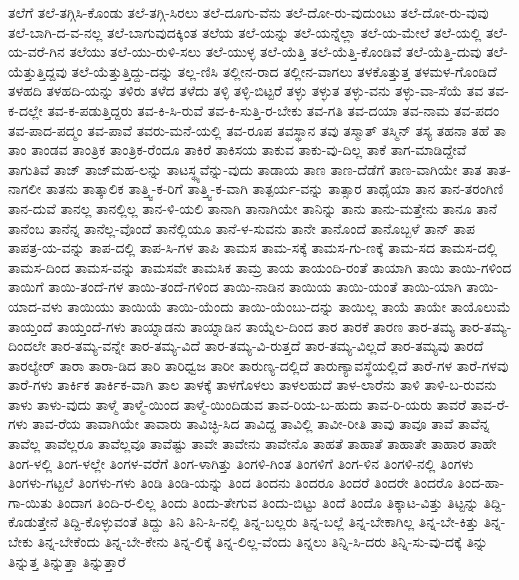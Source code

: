 ತಲೆಗೆ
ತಲೆ-ತಗ್ಗಿಸಿ-ಕೊಂಡು
ತಲೆ-ತಗ್ಗಿ-ಸಿರಲು
ತಲೆ-ದೂಗು-ವೆನು
ತಲೆ-ದೋ-ರು-ವುದುಂಟು
ತಲೆ-ದೋ-ರು-ವುವು
ತಲೆ-ಬಾಗಿ-ದ-ವ-ನಲ್ಲ
ತಲೆ-ಬಾಗುವುದಕ್ಕಿಂತ
ತಲೆಯ
ತಲೆ-ಯನ್ನು
ತಲೆ-ಯನ್ನೆಲ್ಲಾ
ತಲೆ-ಯ-ಮೇಲೆ
ತಲೆ-ಯಲ್ಲಿ
ತಲೆ-ಯ-ವರೆ-ಗಿನ
ತಲೆಯು
ತಲೆ-ಯು-ರುಳಿ-ಸಲು
ತಲೆ-ಯುಳ್ಳ
ತಲೆ-ಯೆತ್ತಿ
ತಲೆ-ಯೆತ್ತಿ-ಕೊಂಡಿವೆ
ತಲೆ-ಯೆತ್ತಿ-ದುವು
ತಲೆ-ಯೆತ್ತುತ್ತಿದ್ದವು
ತಲೆ-ಯೆತ್ತುತ್ತಿದ್ದು-ದನ್ನು
ತಲ್ಲ-ಣಿಸಿ
ತಲ್ಲೀನ-ರಾದ
ತಲ್ಲೀನ-ವಾಗಲು
ತಳಕೊತ್ತುತ್ತ
ತಳಮಳ-ಗೊಂಡಿದೆ
ತಳಹದಿ
ತಳಹದಿ-ಯನ್ನು
ತಳಿರು
ತಳೆದ
ತಳೆದು
ತಳ್ಳಿ
ತಳ್ಳಿ-ಬಿಟ್ಟರೆ
ತಳ್ಳು
ತಳ್ಳುತ
ತಳ್ಳು-ವನು
ತಳ್ಳು-ವಾ-ಸೆಯೆ
ತವ
ತವ-ಕ-ದಲ್ಲೇ
ತವ-ಕ-ಪಡುತ್ತಿದ್ದರು
ತವ-ಕಿ-ಸಿ-ರುವೆ
ತವ-ಕಿ-ಸುತ್ತಿ-ರ-ಬೇಕು
ತವ-ಗತಿ
ತವ-ದಯಾ
ತವ-ನಾಮ
ತವ-ಪದಂ
ತವ-ಪಾದ-ಪದ್ಮಂ
ತವ-ಪಾವೆ
ತವರು-ಮನೆ-ಯಲ್ಲಿ
ತವ-ರೂಪ
ತವಸ್ಥಾನ
ತವು
ತಸ್ಮಾತ್
ತಸ್ಮಿನ್
ತಸ್ಯ
ತಹನಾ
ತಹೆ
ತಾ
ತಾಂ
ತಾಂಡವ
ತಾಂತ್ರಿಕ
ತಾಂತ್ರಿಕ-ರೆಂದೂ
ತಾಕಿರೆ
ತಾಕಿಸಯ
ತಾಕುವ
ತಾಕು-ವು-ದಿಲ್ಲ
ತಾಕೆ
ತಾಗ-ಮಾಡಿದ್ದೇವೆ
ತಾಗುತಿವೆ
ತಾಜ್
ತಾಜ್‌ಮಹ-ಲನ್ನು
ತಾಟಸ್ಥ್ಯವೆನ್ನು-ವುದು
ತಾಡಾಯ
ತಾಣ
ತಾಣ-ದೆಡೆಗೆ
ತಾಣ-ವಾಗಿಯೇ
ತಾತ
ತಾತ-ನಾಗಲೀ
ತಾತನು
ತಾತ್ಕಾಲಿಕ
ತಾತ್ತ್ವಿ-ಕ-ರಿಗೆ
ತಾತ್ತ್ವಿ-ಕ-ವಾಗಿ
ತಾತ್ಪರ್ಯ-ವನ್ನು
ತಾತ್ಸಾರ
ತಾಥೈಯಾ
ತಾನ
ತಾನ-ತರಂಗಿಣಿ
ತಾನ-ದುವೆ
ತಾನಲ್ಲ
ತಾನಲ್ಲಿಲ್ಲ
ತಾನ-ಳಿ-ಯಲಿ
ತಾನಾಗಿ
ತಾನಾಗಿಯೇ
ತಾನಿನ್ನು
ತಾನು
ತಾನು-ಮತ್ತೇನು
ತಾನೂ
ತಾನೆ
ತಾನೆಂಬ
ತಾನೆನ್ನ
ತಾನೆಲ್ಲ-ವೊಂದೆ
ತಾನೆಲ್ಲಿಯೂ
ತಾನೆ-ಳ-ಸುವನು
ತಾನೇ
ತಾನೊಂದೆ
ತಾನೊಬ್ಬಳೆ
ತಾನ್
ತಾಪ
ತಾಪತ್ರ-ಯ-ವನ್ನು
ತಾಪ-ದಲ್ಲಿ
ತಾಪ-ಸಿ-ಗಳ
ತಾಪಿ
ತಾಮಸ
ತಾಮ-ಸಕ್ಕೆ
ತಾಮಸ-ಗು-ಣಕ್ಕೆ
ತಾಮ-ಸದ
ತಾಮಸ-ದಲ್ಲಿ
ತಾಮಸ-ದಿಂದ
ತಾಮಸ-ವನ್ನು
ತಾಮಸವೇ
ತಾಮಸಿಕ
ತಾಮ್ರ
ತಾಯ
ತಾಯಂದಿ-ರಂತೆ
ತಾಯಾಗಿ
ತಾಯಿ
ತಾಯಿ-ಗಳಿಂದ
ತಾಯಿಗೆ
ತಾಯಿ-ತಂದೆ-ಗಳ
ತಾಯಿ-ತಂದೆ-ಗಳಿಂದ
ತಾಯಿ-ನಾಡಿನ
ತಾಯಿಯ
ತಾಯಿ-ಯಂತೆ
ತಾಯಿ-ಯಾಗಿ
ತಾಯಿ-ಯಾದ-ವಳು
ತಾಯಿಯು
ತಾಯಿಯೆ
ತಾಯಿ-ಯೆಂದು
ತಾಯಿ-ಯೆಂಬು-ದನ್ನು
ತಾಯಿಲ್ಲ
ತಾಯೆ
ತಾಯೇ
ತಾಯೊಲುಮೆ
ತಾಯ್ತಂದೆ
ತಾಯ್ತಂದೆ-ಗಳು
ತಾಯ್ನಾಡನು
ತಾಯ್ನಾಡಿನ
ತಾಯ್ನೆಲ-ದಿಂದ
ತಾರ
ತಾರಕೆ
ತಾರಣ
ತಾರ-ತಮ್ಯ
ತಾರ-ತಮ್ಯ-ದಿಂದಲೇ
ತಾರ-ತಮ್ಯ-ವನ್ನೇ
ತಾರ-ತಮ್ಯ-ವಿದೆ
ತಾರ-ತಮ್ಯ-ವಿ-ರುತ್ತದೆ
ತಾರ-ತಮ್ಯ-ವಿಲ್ಲದೆ
ತಾರ-ತಮ್ಯವು
ತಾರದೆ
ತಾರಲ್ಯೇರ್
ತಾರಾ
ತಾರಾ-ಡಿದ
ತಾರಿ
ತಾರಿಧ್ವಜ
ತಾರೀ
ತಾರುಣ್ಯ-ದಲ್ಲಿದೆ
ತಾರುಣ್ಯಾವಸ್ಥೆಯಲ್ಲಿದೆ
ತಾರೆ-ಗಳ
ತಾರೆ-ಗಳವು
ತಾರೆ-ಗಳು
ತಾರ್ಕಿಕ
ತಾರ್ಕಿಕ-ವಾಗಿ
ತಾಲ
ತಾಳಕ್ಕೆ
ತಾಳಗೊಳಲು
ತಾಳಲಹುದೆ
ತಾಳ-ಲಾರೆನು
ತಾಳಿ
ತಾಳಿ-ಬ-ರುವನು
ತಾಳು
ತಾಳು-ವುದು
ತಾಳ್ಮೆ
ತಾಳ್ಮೆ-ಯಿಂದ
ತಾಳ್ಮೆ-ಯಿಂದಿಡುವ
ತಾವ-ರಿಯ-ಬ-ಹುದು
ತಾವ-ರಿ-ಯರು
ತಾವರೆ
ತಾವ-ರೆ-ಗಳು
ತಾವ-ರೆಯ
ತಾವಾಗಿಯೇ
ತಾವಾರು
ತಾವಿಚ್ಛಿ-ಸಿದ
ತಾವಿದ್ದ
ತಾವಿಲ್ಲಿ
ತಾವೀ-ರೀತಿ
ತಾವು
ತಾವೂ
ತಾವೆ
ತಾವೆನ್ನ
ತಾವೆಲ್ಲ
ತಾವೆಲ್ಲರೂ
ತಾವೆಲ್ಲವೂ
ತಾವೆಷ್ಟು
ತಾವೇ
ತಾವೇನು
ತಾವೇನೊ
ತಾಹತೆ
ತಾಹಾತೆ
ತಾಹಾತೇ
ತಾಹಾರ
ತಾಹೇ
ತಿಂಗ-ಳಲ್ಲಿ
ತಿಂಗ-ಳಲ್ಲೇ
ತಿಂಗಳ-ವರೆಗೆ
ತಿಂಗ-ಳಾಗಿತ್ತು
ತಿಂಗಳಿ-ಗಿಂತ
ತಿಂಗಳಿಗೆ
ತಿಂಗ-ಳಿನ
ತಿಂಗಳಿ-ನಲ್ಲಿ
ತಿಂಗಳು
ತಿಂಗಳು-ಗಟ್ಟಲೆ
ತಿಂಗಳು-ಗಳು
ತಿಂಡಿ
ತಿಂಡಿ-ಯನ್ನು
ತಿಂದ
ತಿಂದನು
ತಿಂದರೂ
ತಿಂದರೆ
ತಿಂದರೇ
ತಿಂದರೊ
ತಿಂದ-ಹಾ-ಗಾ-ಯಿತು
ತಿಂದಾಗ
ತಿಂದಿ-ರ-ಲಿಲ್ಲ
ತಿಂದು
ತಿಂದು-ತೇಗುವ
ತಿಂದು-ಬಿಟ್ಟು
ತಿಂದೆ
ತಿಂದೊ
ತಿಕ್ಕಾಟ-ವಿತ್ತು
ತಿಟ್ಟನ್ನು
ತಿದ್ದಿ-ಕೊಡುತ್ತೇನೆ
ತಿದ್ದಿ-ಕೊಳ್ಳುವಂತೆ
ತಿದ್ದು
ತಿನಿ
ತಿನಿ-ಸಿ-ನಲ್ಲಿ
ತಿನ್ನ-ಬಲ್ಲರು
ತಿನ್ನ-ಬಲ್ಲೆ
ತಿನ್ನ-ಬೇಕಾಗಿಲ್ಲ
ತಿನ್ನ-ಬೇ-ಕಿತ್ತು
ತಿನ್ನ-ಬೇಕು
ತಿನ್ನ-ಬೇಕೆಂದು
ತಿನ್ನ-ಬೇ-ಕೇನು
ತಿನ್ನ-ಲಿಕ್ಕೆ
ತಿನ್ನ-ಲಿಲ್ಲ-ವೆಂದು
ತಿನ್ನಲು
ತಿನ್ನಿ-ಸಿ-ದರು
ತಿನ್ನಿ-ಸು-ವು-ದಕ್ಕೆ
ತಿನ್ನು
ತಿನ್ನುತ್ತ
ತಿನ್ನುತ್ತಾ
ತಿನ್ನುತ್ತಾರೆ
